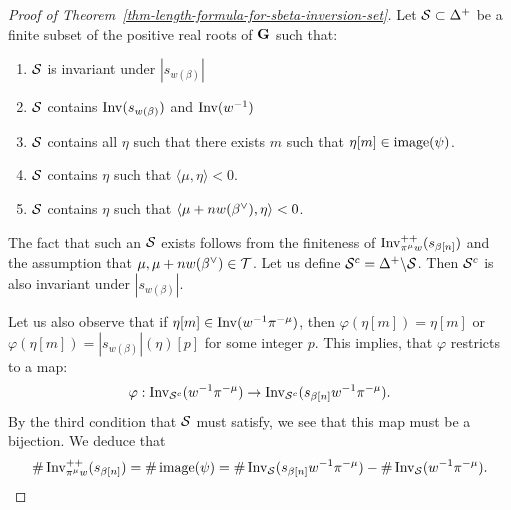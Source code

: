 \documentclass[10pt]{amsart}
\begin{document}
\begin{proof}[Proof of Theorem~\ref{thm-length-formula-for-sbeta-inversion-set}]
Let $\mathcal{S} \subset \Delta^+$ be a finite subset of the positive real roots of $\mathbf{G}$ such that:
\begin{enumerate}
\item $\mathcal{S}$ is invariant under $|s_{w(\beta)}|$
\item $\mathcal{S}$ contains $\operatorname{Inv}(s_{w(\beta)})$ and $\operatorname{Inv}(w^{-1})$
\item $\mathcal{S}$ contains all $\eta$ such that there exists $m$ such that $\eta[m] \in \operatorname{image}(\psi)$.
\item $\mathcal{S}$ contains $\eta$ such that $\langle \mu, \eta \rangle < 0$.
\item $\mathcal{S}$ contains $\eta$ such that $\langle \mu + n w(\beta^\vee), \eta \rangle < 0$.
\end{enumerate}
The fact that such an $\mathcal{S}$ exists follows from the finiteness of $\operatorname{Inv}^{++}_{\pi^\mu w}(s_{\beta[n]})$ and the assumption that $\mu,\mu+nw(\beta^\vee)\in\mathcal{T}$. Let us define $\mathcal{S}^c = \Delta^+ \backslash \mathcal{S}$. Then $\mathcal{S}^c$ is also invariant under $|s_{w(\beta)}|$.

Let us also observe that if $\eta[m] \in \operatorname{Inv}(w^{-1}\pi^{-\mu})$, then $\varphi(\eta[m]) = \eta[m]$ or $\varphi(\eta[m]) = |s_{w(\beta)}|(\eta)[p]$ for some integer $p$. This implies, that $\varphi$ restricts to a map:
\begin{equation*}
\varphi: \operatorname{Inv}_{\mathcal{S}^c} (w^{-1} \pi^{-\mu}) \rightarrow \operatorname{Inv}_{\mathcal{S}^c}(s_{\beta[n]} w^{-1} \pi^{-\mu}).
\end{equation*}
By the third condition that $\mathcal{S}$ must satisfy, we see that this map must be a bijection. We deduce that
\begin{equation*}
\# \operatorname{Inv}^{++}_{\pi^\mu w}(s_{\beta[n]}) = \# \operatorname{image}(\psi) = \# \operatorname{Inv}_{\mathcal{S}}(s_{\beta[n]} w^{-1} \pi^{-\mu}) - \# \operatorname{Inv}_{\mathcal{S}}(w^{-1} \pi^{-\mu}).
\end{equation*}


\end{proof}
\end{document}
